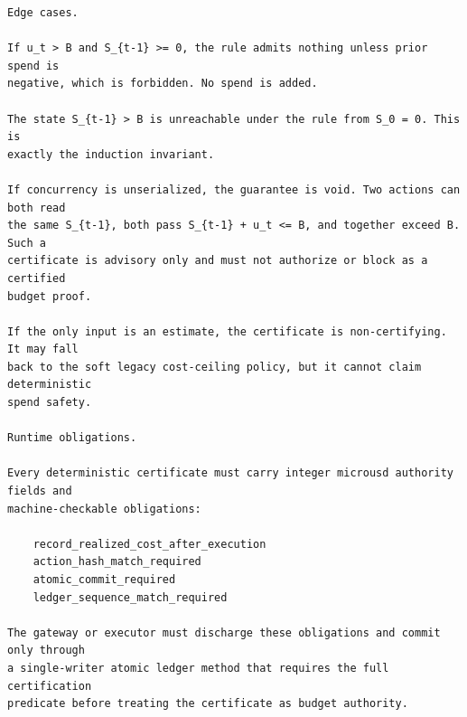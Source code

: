 \begin{small}
\begin{verbatim}
Edge cases.

If u_t > B and S_{t-1} >= 0, the rule admits nothing unless prior spend is
negative, which is forbidden. No spend is added.

The state S_{t-1} > B is unreachable under the rule from S_0 = 0. This is
exactly the induction invariant.

If concurrency is unserialized, the guarantee is void. Two actions can both read
the same S_{t-1}, both pass S_{t-1} + u_t <= B, and together exceed B. Such a
certificate is advisory only and must not authorize or block as a certified
budget proof.

If the only input is an estimate, the certificate is non-certifying. It may fall
back to the soft legacy cost-ceiling policy, but it cannot claim deterministic
spend safety.

Runtime obligations.

Every deterministic certificate must carry integer microusd authority fields and
machine-checkable obligations:

    record_realized_cost_after_execution
    action_hash_match_required
    atomic_commit_required
    ledger_sequence_match_required

The gateway or executor must discharge these obligations and commit only through
a single-writer atomic ledger method that requires the full certification
predicate before treating the certificate as budget authority.
\end{verbatim}
\end{small}
